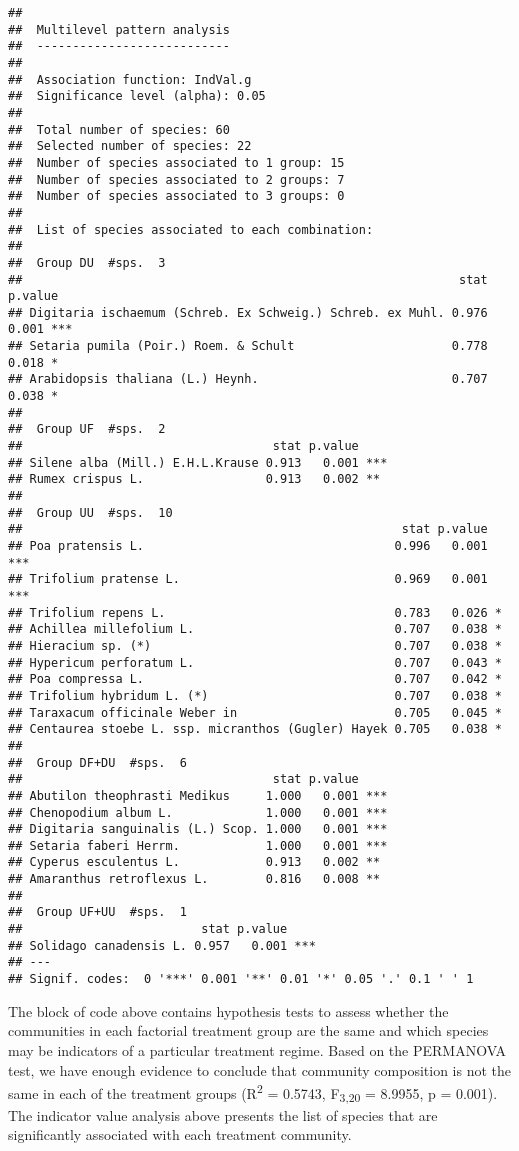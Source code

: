 \documentclass[
]{article}
\begin{document}
\begin{verbatim}
## 
##  Multilevel pattern analysis
##  ---------------------------
## 
##  Association function: IndVal.g
##  Significance level (alpha): 0.05
## 
##  Total number of species: 60
##  Selected number of species: 22 
##  Number of species associated to 1 group: 15 
##  Number of species associated to 2 groups: 7 
##  Number of species associated to 3 groups: 0 
## 
##  List of species associated to each combination: 
## 
##  Group DU  #sps.  3 
##                                                             stat p.value    
## Digitaria ischaemum (Schreb. Ex Schweig.) Schreb. ex Muhl. 0.976   0.001 ***
## Setaria pumila (Poir.) Roem. & Schult                      0.778   0.018 *  
## Arabidopsis thaliana (L.) Heynh.                           0.707   0.038 *  
## 
##  Group UF  #sps.  2 
##                                   stat p.value    
## Silene alba (Mill.) E.H.L.Krause 0.913   0.001 ***
## Rumex crispus L.                 0.913   0.002 ** 
## 
##  Group UU  #sps.  10 
##                                                     stat p.value    
## Poa pratensis L.                                   0.996   0.001 ***
## Trifolium pratense L.                              0.969   0.001 ***
## Trifolium repens L.                                0.783   0.026 *  
## Achillea millefolium L.                            0.707   0.038 *  
## Hieracium sp. (*)                                  0.707   0.038 *  
## Hypericum perforatum L.                            0.707   0.043 *  
## Poa compressa L.                                   0.707   0.042 *  
## Trifolium hybridum L. (*)                          0.707   0.038 *  
## Taraxacum officinale Weber in                      0.705   0.045 *  
## Centaurea stoebe L. ssp. micranthos (Gugler) Hayek 0.705   0.038 *  
## 
##  Group DF+DU  #sps.  6 
##                                   stat p.value    
## Abutilon theophrasti Medikus     1.000   0.001 ***
## Chenopodium album L.             1.000   0.001 ***
## Digitaria sanguinalis (L.) Scop. 1.000   0.001 ***
## Setaria faberi Herrm.            1.000   0.001 ***
## Cyperus esculentus L.            0.913   0.002 ** 
## Amaranthus retroflexus L.        0.816   0.008 ** 
## 
##  Group UF+UU  #sps.  1 
##                         stat p.value    
## Solidago canadensis L. 0.957   0.001 ***
## ---
## Signif. codes:  0 '***' 0.001 '**' 0.01 '*' 0.05 '.' 0.1 ' ' 1
\end{verbatim}

The block of code above contains hypothesis tests to assess whether the
communities in each factorial treatment group are the same and which
species may be indicators of a particular treatment regime. Based on the
PERMANOVA test, we have enough evidence to conclude that community
composition is not the same in each of the treatment groups
(R\textsuperscript{2} = 0.5743, F\textsubscript{3,20} = 8.9955, p =
0.001). The indicator value analysis above presents the list of species
that are significantly associated with each treatment community.
\end{document}
